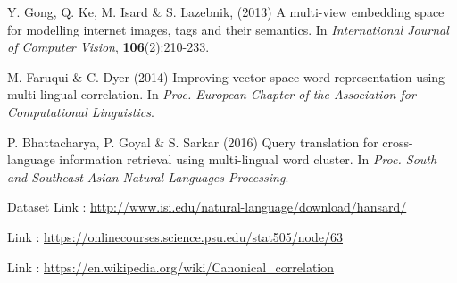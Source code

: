 \documentclass{article} %
\begin{document}
	
	
	
	
	
	
	\begin{thebibliography}{1}
		
		Y. Gong, Q. Ke, M. Isard \& S. Lazebnik, (2013) A multi-view embedding space for modelling internet images, tags and their semantics. In {\it International Journal of Computer Vision}, {\bf 106}(2):210-233.
		
		M. Faruqui \& C. Dyer (2014) Improving vector-space word representation using multi-lingual correlation. In {\it Proc. European Chapter of the Association for Computational Linguistics}.
		
		P. Bhattacharya, P. Goyal \& S. Sarkar (2016) Query translation for cross-language information retrieval using multi-lingual word cluster. In {\it Proc. South and Southeast Asian Natural Languages Processing}.
		
		Dataset Link : \url{http://www.isi.edu/natural-language/download/hansard/}

		Link : \url{https://onlinecourses.science.psu.edu/stat505/node/63}

		 Link : \url{https://en.wikipedia.org/wiki/Canonical_correlation}
		
	\end{thebibliography}
	
	
\end{document}
